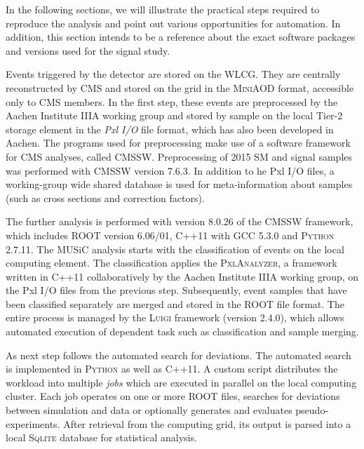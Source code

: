 In the following sections, we will illustrate the practical steps required to reproduce the analysis and point out various opportunities for automation. In addition, this section intends to be a reference about the exact software packages and versions used for the signal study.

Events triggered by the detector are stored on the \ac{WLCG}. They are centrally reconstructed by \ac{CMS} and stored on the grid in the \textsc{MiniAOD} format, accessible only to \ac{CMS} members. In the first step, these events are preprocessed by the Aachen Institute IIIA working group and stored by sample on the local Tier-2 storage element in the \emph{Pxl I/O} file format\cite{Bretz:DevelopmentEnvironmentVisual}, which has also been developed in Aachen. The programs used for preprocessing make use of a software framework for \ac{CMS} analyses, called \textsc{CMSSW}. Preprocessing of 2015 \ac{SM} and signal samples was performed with \textsc{CMSSW} version 7.6.3. In addition to he Pxl I/O files, a working-group wide shared database is used for meta-information about samples (such as cross sections and correction factors).

The further analysis is performed with version 8.0.26 of the \textsc{CMSSW} framework, which includes \textsc{ROOT} version 6.06/01\cite{Brun:ROOTobjectoriented}, C++11 with \textsc{GCC} 5.3.0 and \textsc{Python} 2.7.11\cite{Oliphant:PythonScientificComputing}.
The \ac{MUSiC} analysis starts with the classification of events on the local computing element. The classification applies the \textsc{PxlAnalyzer}, a framework written in C++11 collaboratively by the Aachen Institute IIIA working group, on the Pxl I/O files from the previous step. Subsequently, event samples that have been classified separately are merged and stored in the \textsc{ROOT} file format. The entire process is managed by the \textsc{Luigi} framework \cite{Spotify:Luigi}(version 2.4.0), which allows automated execution of dependent task such as classification and sample merging.

As next step follows the automated search for deviations. The automated search is implemented in \textsc{Python} as well as C++11. A custom script distributes the workload into multiple \emph{jobs} which are executed in parallel on the local computing cluster. Each job operates on one or more \textsc{ROOT} files, searches for deviations between simulation and data or optionally generates and evaluates pseudo-experiments.
After retrieval from the computing grid, its output is parsed into a local \textsc{Sqlite} database for statistical analysis.

